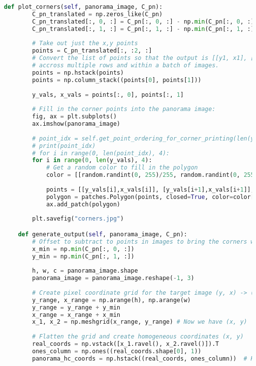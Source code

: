 \documentclass{article}
\begin{document}
\begin{lstlisting}[language=Python]
    def plot_corners(self, panorama_image, C_pn):
        C_pn_translated = np.zeros_like(C_pn)
        C_pn_translated[:, 0, :] = C_pn[:, 0, :] - np.min(C_pn[:, 0, :])
        C_pn_translated[:, 1, :] = C_pn[:, 1, :] - np.min(C_pn[:, 1, :])
        
        # Take out just the x,y points
        points = C_pn_translated[:, :2, :]
        # Convert the list of points so that the output is [[y1, x1], [y2,x2], [y3,x3]] instead of them being split
        # accross multiple rows and within a batch of images.
        points = np.hstack(points)
        points = np.column_stack((points[0], points[1]))
        
        y_vals, x_vals = points[:, 0], points[:, 1]
        
        # Fill in the corner points into the panorama image:
        fig, ax = plt.subplots()
        ax.imshow(panorama_image)
        
        # point_idx = self.get_point_ordering_for_corner_printing(len(y_vals))
        # print(point_idx)
        # for i in range(0, len(point_idx), 4):
        for i in range(0, len(y_vals), 4):
            # Get a random color to fill in the polygon
            color = [[random.randint(0, 255)/255, random.randint(0, 255)/255, random.randint(0, 255)/255]]
            
            points = [[y_vals[i],x_vals[i]], [y_vals[i+1],x_vals[i+1]], [y_vals[i+2],x_vals[i+2]], [y_vals[i+3],x_vals[i+3]]]
            polygon = patches.Polygon(points, closed=True, color=color[0], fill=False, linewidth=2)
            ax.add_patch(polygon)
            
        plt.savefig("corners.jpg")

    def generate_output(self, panorama_image, C_pn):
        # Offset to subtract to points in images to bring the corners within the final image coordinate frame
        x_min = np.min(C_pn[:, 0, :])
        y_min = np.min(C_pn[:, 1, :])
        
        h, w, c = panorama_image.shape
        panorama_image = panorama_image.reshape(-1, 3)
    
        # Create pixel coordinate grid for the target image (y, x) -> (x,y)
        y_range, x_range = np.arange(h), np.arange(w)
        y_range = y_range + y_min
        x_range = x_range + x_min
        x_1, x_2 = np.meshgrid(x_range, y_range) # Now we have (x, y)
        
        # Flatten the grid and create homogeneous coordinates (x, y)
        real_coords = np.vstack([x_1.ravel(), x_2.ravel()]).T
        ones_column = np.ones((real_coords.shape[0], 1))
        panorama_hc_coords = np.hstack((real_coords, ones_column))  # Homogeneous coordinates
        

\end{lstlisting}
\end{document}
